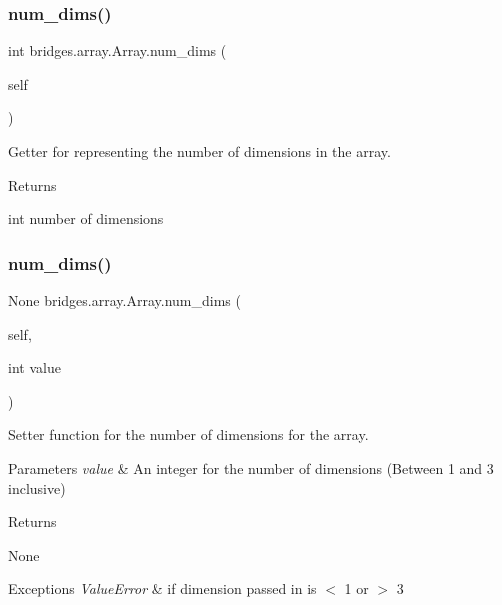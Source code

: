 \subsubsection{\texorpdfstring{num\_dims()}{num\_dims()}\hspace{0.1cm}{\footnotesize\ttfamily [1/2]}}
{\footnotesize\ttfamily  int bridges.\+array.\+Array.\+num\+\_\+dims (\begin{DoxyParamCaption}\item[{}]{self }\end{DoxyParamCaption})}



Getter for representing the number of dimensions in the array. 

\begin{DoxyReturn}{Returns}


int number of dimensions 
\end{DoxyReturn}
\mbox{\label{classbridges_1_1array_1_1_array_afea12a8b38ac62d46413e557c3c1d89d}} 
\subsubsection{\texorpdfstring{num\_dims()}{num\_dims()}\hspace{0.1cm}{\footnotesize\ttfamily [2/2]}}
{\footnotesize\ttfamily  None bridges.\+array.\+Array.\+num\+\_\+dims (\begin{DoxyParamCaption}\item[{}]{self,  }\item[{int}]{value }\end{DoxyParamCaption})}



Setter function for the number of dimensions for the array. 


\begin{DoxyParams}{Parameters}
{\em value} & An integer for the number of dimensions (Between 1 and 3 inclusive) \\
\hline
\end{DoxyParams}
\begin{DoxyReturn}{Returns}


None
\end{DoxyReturn}

\begin{DoxyExceptions}{Exceptions}
{\em Value\+Error} & if dimension passed in is $<$ 1 or $>$ 3 \\
\hline
\end{DoxyExceptions}
\mbox{\label{classbridges_1_1array_1_1_array_ab43ea53de915dec3a57c32918979300b}} 
